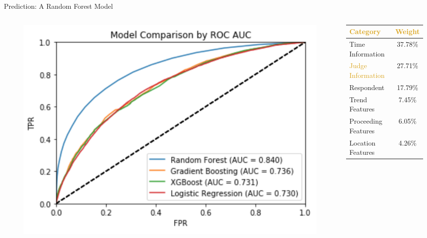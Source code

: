 \begin{frame}{Prediction: A Random Forest Model}
    \begin{columns}
    \begin{column}{0.6\textwidth}

        \begin{figure}
            \centering
            \includegraphics[height = 0.65 \textheight]{images/model_selection3.png}
            \end{figure}
    \end{column}
        
    \begin{column}{0.35\textwidth}
        \begin{table}[h!]
            \small
            \begin{center}
              \begin{tabular}{lc}
                
                \textcolor{goldenrod}{\textbf{Category}} & \textcolor{goldenrod}{\textbf{Weight}}  \\
                \hline
                Time Information & 37.78\%\\
                \textcolor{goldenrod}{Judge Information} & 27.71\%\\
                Respondent & 17.79\%\\
                Trend Features & 7.45\%\\
                Proceeding Features & 6.05\%\\
                Location Features & 4.26\%
              \end{tabular}
            \end{center}
          \end{table}
    \end{column}
        
    \end{columns}
    
\end{frame}

